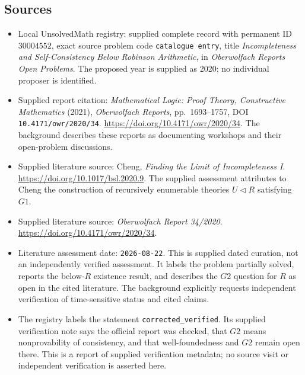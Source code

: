 \documentclass[11pt]{article}
\begin{document}
\subsection{Sources}
\begin{itemize}
\item Local UnsolvedMath registry: supplied complete record with permanent ID \(30004552\), exact source problem code \texttt{catalogue entry}, title \emph{Incompleteness and Self-Consistency Below Robinson Arithmetic}, in \emph{Oberwolfach Reports Open Problems}. The proposed year is supplied as 2020; no individual proposer is identified.
\item Supplied report citation: \emph{Mathematical Logic: Proof Theory, Constructive Mathematics} (2021), \emph{Oberwolfach Reports}, pp.\ 1693--1757, DOI \texttt{10.4171/owr/2020/34}. \url{https://doi.org/10.4171/owr/2020/34}. The background describes these reports as documenting workshops and their open-problem discussions.
\item Supplied literature source: Cheng, \emph{Finding the Limit of Incompleteness I}. \url{https://doi.org/10.1017/bsl.2020.9}. The supplied assessment attributes to Cheng the construction of recursively enumerable theories \(U\lhd R\) satisfying \(G1\).
\item Supplied literature source: \emph{Oberwolfach Report 34/2020}. \url{https://doi.org/10.4171/owr/2020/34}.
\item Literature assessment date: \texttt{2026-08-22}. This is supplied dated curation, not an independently verified assessment. It labels the problem partially solved, reports the below-\(R\) existence result, and describes the \(G2\) question for \(R\) as open in the cited literature. The background explicitly requests independent verification of time-sensitive status and cited claims.
\item The registry labels the statement \texttt{corrected\_verified}. Its supplied verification note says the official report was checked, that \(G2\) means nonprovability of consistency, and that well-foundedness and \(G2\) remain open there. This is a report of supplied verification metadata; no source visit or independent verification is asserted here.
\end{itemize}
\end{document}
